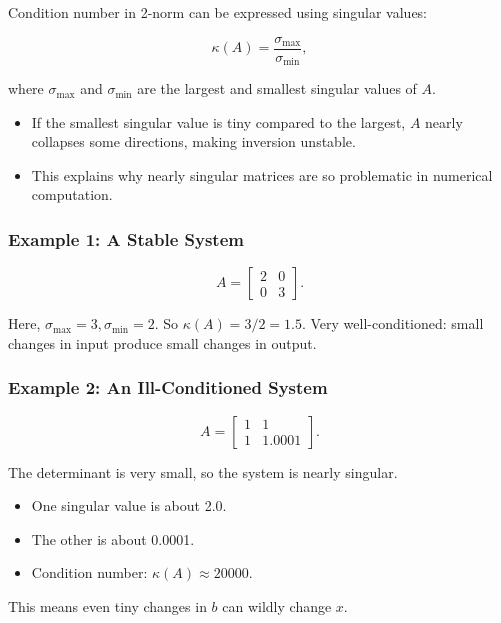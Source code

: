 \documentclass[
  letterpaper,
  DIV=11,
  numbers=noendperiod]{scrreprt}
\providecommand{\tightlist}{%
  \setlength{\itemsep}{0pt}\setlength{\parskip}{0pt}}
\begin{document}
Condition number in 2-norm can be expressed using singular values:

\[
\kappa(A) = \frac{\sigma_{\max}}{\sigma_{\min}},
\]

where \(\sigma_{\max}\) and \(\sigma_{\min}\) are the largest and
smallest singular values of \(A\).

\begin{itemize}
\tightlist
\item
  If the smallest singular value is tiny compared to the largest, \(A\)
  nearly collapses some directions, making inversion unstable.
\item
  This explains why nearly singular matrices are so problematic in
  numerical computation.
\end{itemize}

\subsubsection{Example 1: A Stable
System}\label{example-1-a-stable-system}

\[
A = \begin{bmatrix}2 & 0 \\ 0 & 3\end{bmatrix}.
\]

Here, \(\sigma_{\max} = 3, \sigma_{\min} = 2\). So
\(\kappa(A) = 3/2 = 1.5\). Very well-conditioned: small changes in input
produce small changes in output.

\subsubsection{Example 2: An Ill-Conditioned
System}\label{example-2-an-ill-conditioned-system}

\[
A = \begin{bmatrix}1 & 1 \\ 1 & 1.0001\end{bmatrix}.
\]

The determinant is very small, so the system is nearly singular.

\begin{itemize}
\tightlist
\item
  One singular value is about 2.0.
\item
  The other is about 0.0001.
\item
  Condition number: \(\kappa(A) \approx 20000\).
\end{itemize}

This means even tiny changes in \(b\) can wildly change \(x\).
\end{document}
